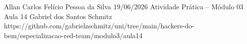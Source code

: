 \documentclass{article}
\begin{document}
{Allan Carlos Felício Pessoa da Silva}
{19/06/2026}
{Atividade Prática -- Módulo 03}
{Aula 14}
{Gabriel dos Santos Schmitz}
{https://github.com/gabrielzschmitz/uni/tree/main/hackers-do-bem/especializacao-red-team/modulo3/aula14}





\newpage
\printbibliography[title=Referências]
\end{document}
